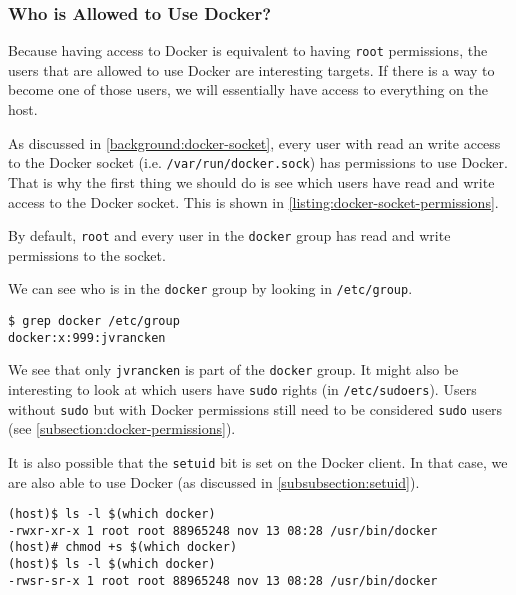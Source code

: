 \subsubsection{Who is Allowed to Use Docker?}\label{subsubsection:docker-permissions-host}
Because having access to Docker is equivalent to having \lstinline{root} permissions, the users that are allowed to use Docker are interesting targets. If there is a way to become one of those users, we will essentially have access to everything on the host.

As discussed in \autoref{background:docker-socket}, every user with read an write access to the Docker socket (i.e. \lstinline{/var/run/docker.sock}) has permissions to use Docker. That is why the first thing we should do is see which users have read and write access to the Docker socket. This is shown in \autoref{listing:docker-socket-permissions}.

By default, \lstinline{root} and every user in the \lstinline{docker} group has read and write permissions to the socket.

\medskip

We can see who is in the \lstinline{docker} group by looking in \lstinline{/etc/group}.
\begin{lstlisting}[caption={See what users are in the \lstinline{docker} group.},captionpos=b]
$ grep docker /etc/group
docker:x:999:jvrancken
\end{lstlisting}
We see that only \lstinline{jvrancken} is part of the \lstinline{docker} group. It might also be interesting to look at which users have \lstinline{sudo} rights (in \lstinline{/etc/sudoers}). Users without \lstinline{sudo} but with Docker permissions still need to be considered \lstinline{sudo} users (see \autoref{subsection:docker-permissions}).

\medskip

It is also possible that the \lstinline{setuid} bit is set on the Docker client. In that case, we are also able to use Docker (as discussed in \autoref{subsubsection:setuid}).
\begin{lstlisting}[caption={Permissions without and with the \lstinline{setuid} bit.},captionpos=b]
(host)$ ls -l $(which docker)
-rwxr-xr-x 1 root root 88965248 nov 13 08:28 /usr/bin/docker
(host)# chmod +s $(which docker)
(host)$ ls -l $(which docker)
-rwsr-sr-x 1 root root 88965248 nov 13 08:28 /usr/bin/docker
\end{lstlisting}
